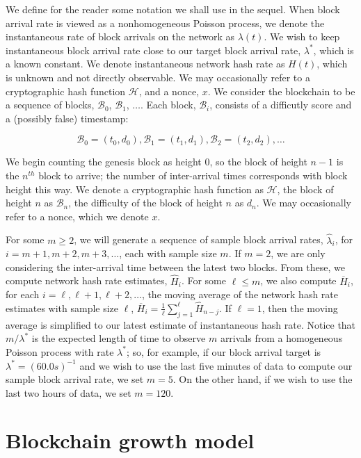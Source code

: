 \documentclass[12pt,english]{mrl}
\theoremstyle{definition}
\renewcommand{\geq}{\geqslant}
\renewcommand{\leq}{\leqslant}
\numberwithin{equation}{section}
\numberwithin{figure}{section}
\numberwithin{equation}{section}
\numberwithin{equation}{section}
\numberwithin{figure}{section}
\begin{document}
We define for the reader some notation we shall use in the sequel.  When block arrival rate is viewed as a nonhomogeneous Poisson process, we denote the instantaneous rate of block arrivals on the network as $\lambda(t)$. We wish to keep instantaneous block arrival rate close to our target block arrival rate, $\lambda^*$, which is a known constant. We denote instantaneous network hash rate as $H(t)$, which is unknown and not directly observable. We may occasionally refer to a cryptographic hash function $\mathcal{H}$, and a nonce, $x$. We consider the blockchain to be a sequence of blocks, $\mathcal{B}_0$, $\mathcal{B}_1$, $\ldots$. Each block, $\mathcal{B}_i$, consists of a difficutly score and a (possibly false) timestamp:

\[\mathcal{B}_0 = (t_0, d_0), \mathcal{B}_1 = (t_1, d_1), \mathcal{B}_2 = (t_2, d_2), \ldots\]

We begin counting the genesis block as height $0$, so the block of height $n-1$ is the $n^{th}$ block to arrive; the number of inter-arrival times corresponds with block height this way. We denote a cryptographic hash function as $\mathcal{H}$, the block of height $n$ as $\mathcal{B}_{n}$, the difficulty of the block of height $n$ as $d_{n}$. We may occasionally refer to a nonce, which we denote $x$.

For some $m \geq 2$, we will generate a sequence of sample block arrival rates, $\hat{\lambda}_{i}$, for $i=m+1, m+2, m+3, \ldots$, each with sample size $m$. If $m=2$, we are only considering the inter-arrival time between the latest two blocks. From these, we compute network hash rate estimates, $\hat{H}_i$. For some $\ell \leq m$, we also compute $\overline{H}_i$, for each $i = \ell, \ell+1, \ell+2, \ldots$, the moving average of the network hash rate estimates with sample size $\ell$, $\overline{H}_i = \frac{1}{\ell}\sum_{j=1}^{\ell} \hat{H}_{n-j}$. If $\ell = 1$, then the moving average is simplified to our latest estimate of instantaneous hash rate. Notice that $m/\lambda^*$ is the expected length of time to observe $m$ arrivals from a homogeneous Poisson process with rate $\lambda^*$; so, for example, if our block arrival target is $\lambda^{*} = (60.0 s)^{-1}$ and we wish to use the last five minutes of data to compute our sample block arrival rate, we set $m=5$. On the other hand, if we wish to use the last two hours of data, we set $m=120$.



\section{Blockchain growth model}\label{modelDef}
\end{document}
